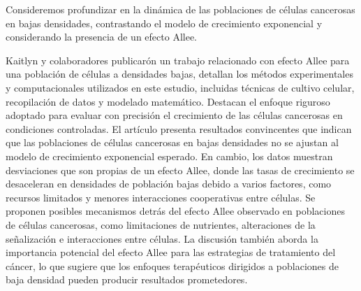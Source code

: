 \documentclass{article}
\begin{document}
Consideremos profundizar en la dinámica de las poblaciones de células cancerosas en bajas densidades, contrastando el modelo de crecimiento exponencial y considerando la presencia de un efecto Allee.

Kaitlyn y colaboradores\cite{Kaitlyn1782019} publicarón un trabajo relacionado con efecto Allee para una población de células a densidades bajas, detallan los métodos experimentales y computacionales utilizados en este estudio, incluidas técnicas de cultivo celular, recopilación de datos y modelado matemático. Destacan el enfoque riguroso adoptado para evaluar con precisión el crecimiento de las células cancerosas en condiciones controladas. El artículo presenta resultados convincentes que indican que las poblaciones de células cancerosas en bajas densidades no se ajustan al modelo de crecimiento exponencial esperado. En cambio, los datos muestran desviaciones que son propias de un efecto Allee, donde las tasas de crecimiento se desaceleran en densidades de población bajas debido a varios factores, como recursos limitados y menores interacciones cooperativas entre células. Se proponen posibles mecanismos detrás del efecto Allee observado en poblaciones de células cancerosas, como limitaciones de nutrientes, alteraciones de la señalización e interacciones entre células. La discusión también aborda la importancia potencial del efecto Allee para las estrategias de tratamiento del cáncer, lo que sugiere que los enfoques terapéuticos dirigidos a poblaciones de baja densidad pueden producir resultados prometedores.
\end{document}
